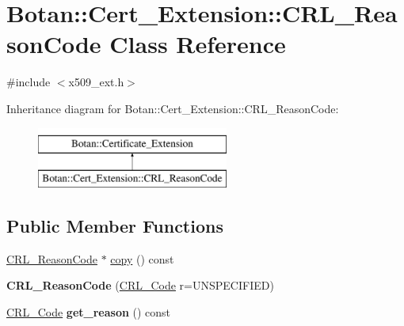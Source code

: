 \hypertarget{classBotan_1_1Cert__Extension_1_1CRL__ReasonCode}{\section{Botan\-:\-:Cert\-\_\-\-Extension\-:\-:C\-R\-L\-\_\-\-Reason\-Code Class Reference}
\label{classBotan_1_1Cert__Extension_1_1CRL__ReasonCode}
}


{\ttfamily \#include $<$x509\-\_\-ext.\-h$>$}

Inheritance diagram for Botan\-:\-:Cert\-\_\-\-Extension\-:\-:C\-R\-L\-\_\-\-Reason\-Code\-:\begin{figure}[H]
\begin{center}
\leavevmode
\includegraphics[height=2.000000cm]{classBotan_1_1Cert__Extension_1_1CRL__ReasonCode}
\end{center}
\end{figure}
\subsection*{Public Member Functions}
\begin{DoxyCompactItemize}
\item 
\hyperlink{classBotan_1_1Cert__Extension_1_1CRL__ReasonCode}{C\-R\-L\-\_\-\-Reason\-Code} $\ast$ \hyperlink{classBotan_1_1Cert__Extension_1_1CRL__ReasonCode_a34438d6c14f9f6127e9802c50041ec8b}{copy} () const 
\item 
\hypertarget{classBotan_1_1Cert__Extension_1_1CRL__ReasonCode_acd4be8a6c3b67249dd5461a7e9723c87}{{\bfseries C\-R\-L\-\_\-\-Reason\-Code} (\hyperlink{namespaceBotan_a781d47b68b281fe5b934138d13de2dfc}{C\-R\-L\-\_\-\-Code} r=U\-N\-S\-P\-E\-C\-I\-F\-I\-E\-D)}\label{classBotan_1_1Cert__Extension_1_1CRL__ReasonCode_acd4be8a6c3b67249dd5461a7e9723c87}

\item 
\hypertarget{classBotan_1_1Cert__Extension_1_1CRL__ReasonCode_a9338f0cf443acfd181693b7c69ed27b0}{\hyperlink{namespaceBotan_a781d47b68b281fe5b934138d13de2dfc}{C\-R\-L\-\_\-\-Code} {\bfseries get\-\_\-reason} () const }\label{classBotan_1_1Cert__Extension_1_1CRL__ReasonCode_a9338f0cf443acfd181693b7c69ed27b0}

\end{DoxyCompactItemize}


